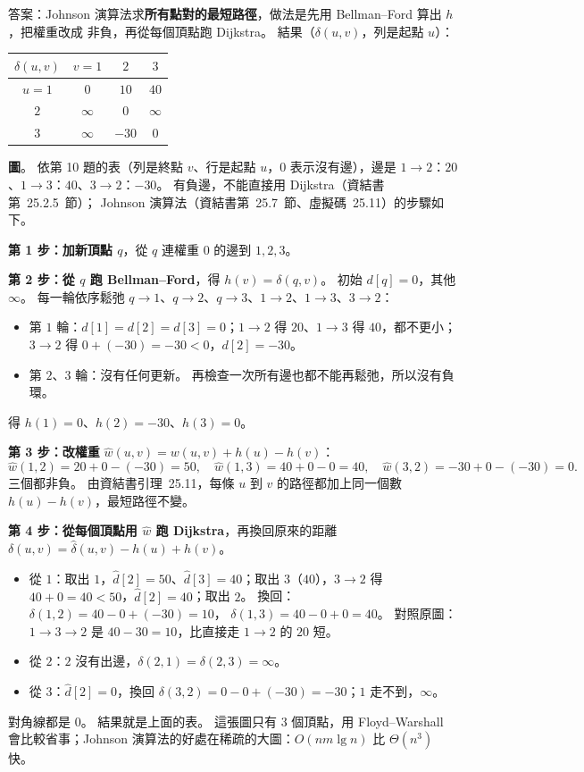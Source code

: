 \begin{pastsoln}
答案：Johnson 演算法求\textbf{所有點對的最短路徑}，做法是先用 Bellman--Ford 算出 $h$，把權重改成
非負，再從每個頂點跑 Dijkstra。 結果（$\delta(u, v)$，列是起點 $u$）：
\begin{center}
\begin{tabular}{c|ccc}
$\delta(u, v)$ & $v = 1$ & $2$ & $3$ \\ \hline
$u = 1$ & $0$ & $10$ & $40$ \\
$2$ & $\infty$ & $0$ & $\infty$ \\
$3$ & $\infty$ & $-30$ & $0$ \\
\end{tabular}
\end{center}

\textbf{圖}。 依第 10 題的表（列是終點 $v$、行是起點 $u$，$0$ 表示沒有邊），邊是
$1 \to 2$：$20$、$1 \to 3$：$40$、$3 \to 2$：$-30$。 有負邊，不能直接用 Dijkstra（資結書第~25.2.5~節）；
Johnson 演算法（資結書第~25.7~節、虛擬碼~25.11）的步驟如下。

\textbf{第 1 步：加新頂點 $q$}，從 $q$ 連權重 $0$ 的邊到 $1, 2, 3$。

\textbf{第 2 步：從 $q$ 跑 Bellman--Ford}，得 $h(v) = \delta(q, v)$。 初始 $d[q] = 0$，其他 $\infty$。
每一輪依序鬆弛 $q \to 1$、$q \to 2$、$q \to 3$、$1 \to 2$、$1 \to 3$、$3 \to 2$：
\begin{itemize}
\item 第 $1$ 輪：$d[1] = d[2] = d[3] = 0$；$1 \to 2$ 得 $20$、$1 \to 3$ 得 $40$，都不更小；
$3 \to 2$ 得 $0 + (-30) = -30 < 0$，$d[2] = -30$。
\item 第 $2$、$3$ 輪：沒有任何更新。 再檢查一次所有邊也都不能再鬆弛，所以沒有負環。
\end{itemize}
得 $h(1) = 0$、$h(2) = -30$、$h(3) = 0$。

\textbf{第 3 步：改權重} $\hat{w}(u, v) = w(u, v) + h(u) - h(v)$：
\[
\hat{w}(1, 2) = 20 + 0 - (-30) = 50, \quad
\hat{w}(1, 3) = 40 + 0 - 0 = 40, \quad
\hat{w}(3, 2) = -30 + 0 - (-30) = 0.
\]
三個都非負。 由資結書引理~25.11，每條 $u$ 到 $v$ 的路徑都加上同一個數 $h(u) - h(v)$，最短路徑不變。

\textbf{第 4 步：從每個頂點用 $\hat{w}$ 跑 Dijkstra}，再換回原來的距離
$\delta(u, v) = \hat{\delta}(u, v) - h(u) + h(v)$。
\begin{itemize}
\item 從 $1$：取出 $1$，$\hat{d}[2] = 50$、$\hat{d}[3] = 40$；取出 $3$（$40$），$3 \to 2$ 得
$40 + 0 = 40 < 50$，$\hat{d}[2] = 40$；取出 $2$。 換回：$\delta(1, 2) = 40 - 0 + (-30) = 10$，
$\delta(1, 3) = 40 - 0 + 0 = 40$。 對照原圖：$1 \to 3 \to 2$ 是 $40 - 30 = 10$，比直接走 $1 \to 2$
的 $20$ 短。
\item 從 $2$：$2$ 沒有出邊，$\delta(2, 1) = \delta(2, 3) = \infty$。
\item 從 $3$：$\hat{d}[2] = 0$，換回 $\delta(3, 2) = 0 - 0 + (-30) = -30$；$1$ 走不到，$\infty$。
\end{itemize}
對角線都是 $0$。 結果就是上面的表。 這張圖只有 $3$ 個頂點，用 Floyd--Warshall 會比較省事；Johnson
演算法的好處在稀疏的大圖：$O(nm \lg n)$ 比 $\Theta(n^3)$ 快。
\end{pastsoln}
